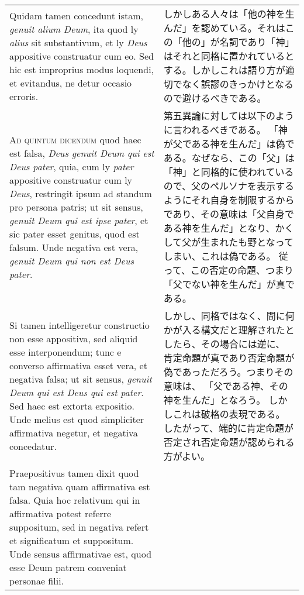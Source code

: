 \documentclass[10pt]{jsarticle} %
\begin{document}
\begin{longtable}{p{21em}p{21em}}
Quidam tamen concedunt istam, \textit{genuit
alium Deum}, ita quod ly \textit{alius} sit substantivum, et ly \textit{Deus} appositive
construatur cum eo. Sed hic est improprius modus loquendi, et evitandus,
ne detur occasio erroris.

&

しかしある人々は「他の神を生んだ」を認めている。それはこの「他の」が名詞であり「神」はそれと同格に置かれているとする。しかしこれは語り方が適切でなく誤謬のきっかけとなるので避けるべきである。


\\



{\scshape Ad quintum dicendum} quod haec est falsa, \textit{Deus genuit Deum qui est Deus
pater}, quia, cum ly \textit{pater} appositive construatur cum ly \textit{Deus}, restringit
ipsum ad standum pro persona patris; ut sit sensus, \textit{genuit Deum qui est
ipse pater}, et sic pater esset genitus, quod est falsum. Unde negativa
est vera, \textit{genuit Deum qui non est Deus pater}. 



&

第五異論に対しては以下のように言われるべきである。
「神が父である神を生んだ」は偽である。なぜなら、この「父」は「神」と同格的に使われているので、父のペルソナを表示するようにそれ自身を制限するからであり、その意味は「父自身である神を生んだ」となり、かくして父が生まれたも野となってしまい、これは偽である。
従って、この否定の命題、つまり「父でない神を生んだ」が真である。

\\


Si tamen intelligeretur
constructio non esse appositiva, sed aliquid esse interponendum; tunc e
converso affirmativa esset vera, et negativa falsa; ut sit sensus,
\textit{genuit Deum qui est Deus qui est pater}. Sed haec est extorta
expositio. Unde melius est quod simpliciter affirmativa negetur, et
negativa concedatur. 


&

しかし、同格ではなく、間に何かが入る構文だと理解されたとしたら、その場合には逆に、
肯定命題が真であり否定命題が偽であっただろう。つまりその意味は、
「父である神、その神を生んだ」となろう。
しかしこれは破格の表現である。
したがって、端的に肯定命題が否定され否定命題が認められる方がよい。

\\


Praepositivus tamen dixit quod tam negativa quam
affirmativa est falsa. Quia hoc relativum qui in affirmativa potest
referre suppositum, sed in negativa refert et significatum et
suppositum. Unde sensus affirmativae est, quod esse Deum patrem
conveniat personae filii. 



\end{longtable}
\end{document}
